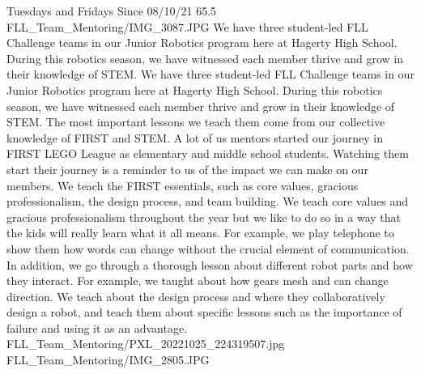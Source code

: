 {Tuesdays and Fridays Since 08/10/21}
{65.5}
{FLL_Team_Mentoring/IMG_3087.JPG}
{We have three student-led FLL Challenge teams in our Junior Robotics program here at Hagerty High School. During this robotics season, we have witnessed each member thrive and grow in their knowledge of STEM.}
{We have three student-led FLL Challenge teams in our Junior Robotics program here at Hagerty High School. During this robotics season, we have witnessed each member thrive and grow in their knowledge of STEM. The most important lessons we teach them come from our collective knowledge of FIRST and STEM. A lot of us mentors started our journey in FIRST LEGO League as elementary and middle school students. Watching them start their journey is a reminder to us of the impact we can make on our members. We teach the FIRST essentials, such as core values, gracious professionalism, the design process, and team building. We teach core values and gracious professionalism throughout the year but we like to do so in a way that the kids will really learn what it all means. For example, we play telephone to show them how words can change without the crucial element of communication. In addition, we go through a thorough lesson about different robot parts and how they interact. For example, we taught about how gears mesh and can change direction. We teach about the design process and where they collaboratively design a robot, and teach them about specific lessons such as the importance of failure and using it as an advantage.  
} 
{FLL_Team_Mentoring/PXL_20221025_224319507.jpg}
{FLL_Team_Mentoring/IMG_2805.JPG}
